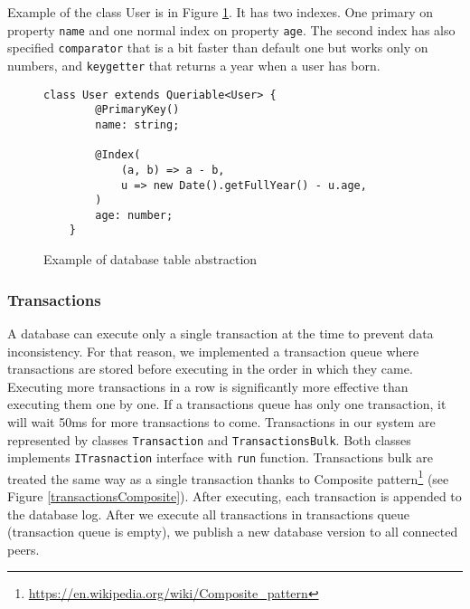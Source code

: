 Example of the class User is in Figure \ref{classExample}. It has two indexes. One primary on property \texttt{name} and one normal index on property \texttt{age}. The second index has also specified \texttt{comparator} that is a bit faster than default one but works only on numbers, and \texttt{keygetter} that returns a year when a user has born. 

\begin{figure}[h]
    \centering
    \begin{lstlisting}[style=ES6]
    class User extends Queriable<User> {
        @PrimaryKey()
        name: string;

        @Index(
            (a, b) => a - b,
            u => new Date().getFullYear() - u.age,
        )
        age: number;
    }
    \end{lstlisting}
    \caption{Example of database table abstraction }
    \label{classExample}
\end{figure}



\subsubsection{Transactions}
A database can execute only a single transaction at the time to prevent data inconsistency. For that reason, we implemented a transaction queue where transactions are stored before executing in the order in which they came. Executing more transactions in a row is significantly more effective than executing them one by one. If a transactions queue has only one transaction, it will wait 50ms for more transactions to come. Transactions in our system are represented by classes \texttt{Transaction} and \texttt{TransactionsBulk}. Both classes implements \texttt{ITrasnaction} interface with \texttt{run} function. Transactions bulk are treated the same way as a single transaction thanks to Composite pattern\footnote{\url{https://en.wikipedia.org/wiki/Composite_pattern}} (see Figure \ref{transactionsComposite}). After executing, each transaction is appended to the database log. After we execute all transactions in transactions queue (transaction queue is empty), we publish a new database version to all connected peers.

